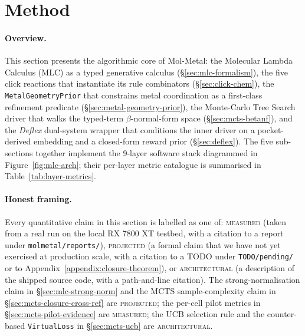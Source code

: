 \section{Method}
\label{sec:method}

\paragraph{Overview.}
This section presents the algorithmic core of Mol-Metal: the
Molecular Lambda Calculus (MLC) as a typed generative calculus
(\S\ref{sec:mlc-formalism}), the five click reactions that
instantiate its rule combinators
(\S\ref{sec:click-chem}), the
\texttt{MetalGeometryPrior} that constrains metal coordination as
a first-class refinement predicate
(\S\ref{sec:metal-geometry-prior}), the Monte-Carlo Tree
Search driver that walks the typed-term
$\beta$-normal-form space
(\S\ref{sec:mcts-betanf}), and the \emph{Deflex} dual-system
wrapper that conditions the inner driver on a pocket-derived
embedding and a closed-form reward prior
(\S\ref{sec:deflex}).
The five sub-sections together implement the 9-layer software
stack diagrammed in Figure~\ref{fig:mlc-arch}; their per-layer
metric catalogue is summarised in
Table~\ref{tab:layer-metrics}.

\paragraph{Honest framing.}
Every quantitative claim in this section is labelled as one of:
\textsc{measured} (taken from a real run on the local RX 7800 XT
testbed, with a citation to a report under
\texttt{molmetal/reports/}),
\textsc{projected} (a formal claim that we have not yet exercised
at production scale, with a citation to a TODO under
\texttt{TODO/pending/} or to Appendix~\ref{appendix:closure-theorem}),
or \textsc{architectural} (a description of the shipped source
code, with a path-and-line citation). The strong-normalisation
claim in \S\ref{sec:mlc-strong-norm} and the MCTS sample-complexity
claim in \S\ref{sec:mcts-closure-cross-ref} are \textsc{projected};
the per-cell pilot metrics in \S\ref{sec:mcts-pilot-evidence} are
\textsc{measured}; the UCB selection rule and the
counter-based \texttt{VirtualLoss} in
\S\ref{sec:mcts-ucb} are \textsc{architectural}.



